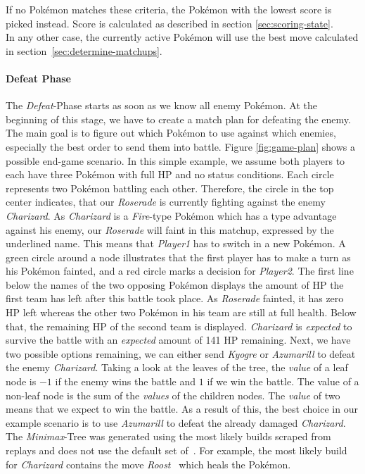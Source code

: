If no Pokémon matches these criteria, the Pokémon with the lowest score is picked instead.
Score is calculated as described in section \ref{sec:scoring-state}. \\
In any other case, the currently active Pokémon will use the best move calculated in section~\ref{sec:determine-matchups}.

\paragraph{Defeat Phase}
\label{sec:defeat-phase}
The \textit{Defeat}-Phase starts as soon as we know all enemy Pokémon. At the beginning of this stage, we have to create
a match plan for defeating the enemy. The main goal is to figure out which Pokémon to use against which enemies, especially
the best order to send them into battle. 
Figure \ref{fig:game-plan} shows a possible end-game scenario. In this simple example, we assume both players to each
have three Pokémon with full \ac{HP} and no status conditions. Each circle represents two Pokémon battling each other.
Therefore, the circle in the top center indicates, that our \textit{Roserade} is currently fighting against the enemy
\textit{Charizard}. As \textit{Charizard} is a \textit{Fire}-type Pokémon which has a type advantage against his enemy,
our \textit{Roserade} will faint in this matchup, expressed by the underlined name. This means that \textit{Player1} has to
switch in a new Pokémon. A green circle around a node illustrates that the first player has to make a turn as his 
Pokémon fainted, and a red circle marks a decision for \textit{Player2}. The first line below the names of the two opposing
Pokémon displays the amount of \ac{HP} the first team has left after this battle took place. As \textit{Roserade} fainted,
it has zero \ac{HP} left whereas the other two Pokémon in his team are still at full health. Below that, the remaining 
\ac{HP} of the second team is displayed. \textit{Charizard} is \textit{expected} to survive the battle with an 
\textit{expected} amount of 141 \ac{HP} remaining. Next, we have two possible options remaining, we can either send
\textit{Kyogre} or \textit{Azumarill} to defeat the enemy \textit{Charizard}. Taking a look at the leaves of the tree,
the \textit{value} of a leaf node is $-1$ if the enemy wins the battle and $1$ if we win the battle. 
The value of a non-leaf node is the sum of the \textit{values} of the children nodes. The \textit{value} of two means that we 
expect to win the battle. As a result of this, the best choice in our example scenario is to use \textit{Azumarill} to 
defeat the already damaged \textit{Charizard}. The \textit{Minimax}-Tree was generated using the most likely builds
scraped from replays and does not use the default set of~\cite{Smogon:DamageCalc}. For example, 
the most likely build for \textit{Charizard} contains the move \textit{Roost}~\autocite{Bulbapedia:Roost} which 
heals the Pokémon.

